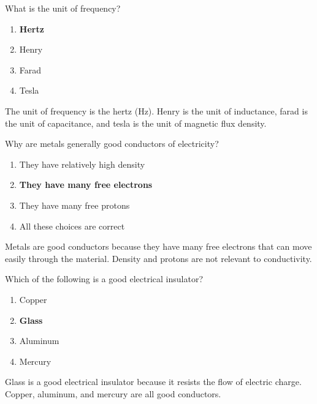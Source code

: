 
\begin{tcolorbox}[colback=gray!10!white,colframe=black!75!black,title={T5A06}]
What is the unit of frequency?
\begin{enumerate}[label=\Alph*,noitemsep]
    \item \textbf{Hertz}
    \item Henry
    \item Farad
    \item Tesla
\end{enumerate}
\end{tcolorbox}
The unit of frequency is the hertz (Hz). Henry is the unit of inductance, farad is the unit of capacitance, and tesla is the unit of magnetic flux density.


\begin{tcolorbox}[colback=gray!10!white,colframe=black!75!black,title={T5A07}]
Why are metals generally good conductors of electricity?
\begin{enumerate}[label=\Alph*,noitemsep]
    \item They have relatively high density
    \item \textbf{They have many free electrons}
    \item They have many free protons
    \item All these choices are correct
\end{enumerate}
\end{tcolorbox}
Metals are good conductors because they have many free electrons that can move easily through the material. Density and protons are not relevant to conductivity.


\begin{tcolorbox}[colback=gray!10!white,colframe=black!75!black,title={T5A08}]
Which of the following is a good electrical insulator?
\begin{enumerate}[label=\Alph*,noitemsep]
    \item Copper
    \item \textbf{Glass}
    \item Aluminum
    \item Mercury
\end{enumerate}
\end{tcolorbox}
Glass is a good electrical insulator because it resists the flow of electric charge. Copper, aluminum, and mercury are all good conductors.

